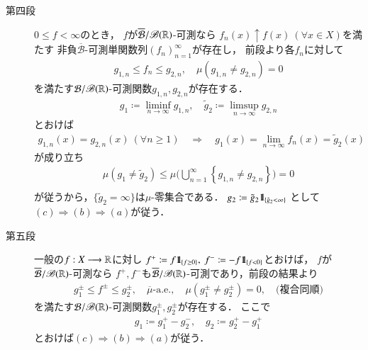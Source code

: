 \begin{prf}
\begin{description}
				\item[第四段]
					$0 \leq f < \infty$のとき，
					$f$が$\overline{\mathcal{B}}/\mathscr{B}(\mathbb{R})$-可測なら
					$f_n(x) \uparrow f(x)\ (\forall x \in X)$を満たす
					非負$\overline{\mathcal{B}}$-可測単関数列$(f_n)_{n=1}^\infty$が存在し，
					前段より各$f_n$に対して
					\begin{align}
						g_{1,n} \leq f_n \leq g_{2,n},
						\quad \mu\left( g_{1,n} \neq g_{2,n} \right)=0
					\end{align}
					を満たす$\mathcal{B}/\mathscr{B}(\mathbb{R})$-可測関数$g_{1,n},g_{2,n}$が存在する．
					\begin{align}
						g_1 \coloneqq \liminf_{n \to \infty} g_{1,n},
						\quad \tilde{g}_2 \coloneqq \limsup_{n \to \infty} g_{2,n}
					\end{align}
					とおけば
					\begin{align}
						g_{1,n}(x) = g_{2,n}(x)\ (\forall n \geq 1)
						\quad \Rightarrow \quad g_1(x) = \lim_{n \to \infty} f_n(x) = \tilde{g}_2(x)
					\end{align}
					が成り立ち
					\begin{align}
						\mu(g_1 \neq \tilde{g}_2)
						\leq \mu\Biggl( \bigcup_{n=1}^\infty \left\{g_{1,n} \neq g_{2,n}\right\} \Biggr)=0 \\
					\end{align}
					が従うから，$\{\tilde{g}_2 = \infty\}$は$\mu$-零集合である．
					$g_2 \coloneqq \tilde{g}_2 \mbox{1}\hspace{-0.25em}\mbox{l}_{\{\tilde{g}_2 < \infty\}}$
					として$(c) \Rightarrow (b) \Rightarrow (a)$が従う．
					
				\item[第五段]
					一般の$f:X \longrightarrow \mathbb{R}$に対し
					$f^+ \coloneqq f \mbox{1}\hspace{-0.25em}\mbox{l}_{\{f \geq 0\}},\ f^- \coloneqq -f \mbox{1}\hspace{-0.25em}\mbox{l}_{\{f < 0\}}$とおけば，
					$f$が$\overline{\mathcal{B}}/\mathscr{B}(\mathbb{R})$-可測なら
					$f^+,f^-$も$\overline{\mathcal{B}}/\mathscr{B}(\mathbb{R})$-可測であり，前段の結果より
					\begin{align}
						g_1^\pm \leq f^\pm \leq g_2^\pm, \quad \mbox{$\overline{\mu}$-a.e.},
						\quad \mu\left( g_1^\pm \neq g_2^\pm \right) = 0,
						\quad \mbox{(複合同順)}
					\end{align}
					を満たす$\mathcal{B}/\mathscr{B}(\mathbb{R})$-可測関数$g_1^{\pm},g_2^{\pm}$が存在する．
					ここで
					\begin{align}
						g_1 \coloneqq g_1^+ - g_2^-,
						\quad g_2 \coloneqq g_2^+ - g_1^+
					\end{align}
					とおけば$(c) \Rightarrow (b) \Rightarrow (a)$が従う．
					\QED
			\end{description}
		\end{prf}
		
